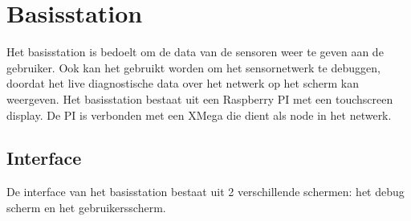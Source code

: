 \section{Basisstation} \label{sec:basestation}



Het basisstation is bedoelt om de data van de sensoren weer te geven aan de gebruiker. Ook kan het gebruikt worden om het sensornetwerk te debuggen, doordat het live diagnostische data over het netwerk op het scherm kan weergeven. Het basisstation bestaat uit een Raspberry PI met een touchscreen display. De PI is verbonden met een XMega die dient als node in het netwerk.

\subsection{Interface}
De interface van het basisstation bestaat uit 2 verschillende schermen: het debug scherm en het gebruikersscherm.

